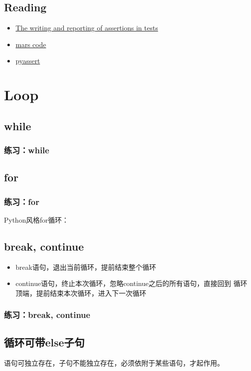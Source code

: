 \subsection{Reading}
\begin{itemize}
\item \href{https://docs.pytest.org/en/latest/assert.html}{The writing and reporting of assertions in tests}
\item \href{https://cacm.acm.org/magazines/2014/2/171689-mars-code/abstract}{mars code}
\item \href{https://github.com/pyclectic/pyassert}{pyassert}
\end{itemize}
\section{Loop}
\subsection{while}
\subsubsection{练习：while}
\subsection{for}
\subsubsection{练习：for}
Python风格for循环： 
\subsection{break, continue}
\begin{itemize}
\item break语句，退出当前循环，提前结束整个循环
\item continue语句，终止本次循环，忽略continue之后的所有语句，直接回到
  循环顶端，提前结束本次循环，进入下一次循环
\end{itemize}
\subsubsection{练习：break, continue}
\subsection{循环可带else子句}
语句可独立存在，子句不能独立存在，必须依附于某些语句，才起作用。
